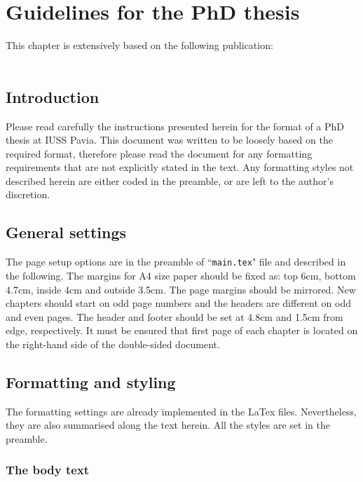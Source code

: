 \chapter{Guidelines for the PhD thesis}
\label{chapter:guidelines}

This chapter is extensively based on the following publication:\\
\\


\section{Introduction}

Please read carefully the instructions presented herein for the format of a PhD thesis at IUSS Pavia. This document was written to be loosely based on the required format, therefore please read the document for any formatting requirements that are not explicitly stated in the text. Any formatting styles not described herein are either coded in the preamble, or are left to the author's discretion.

\section{General settings}

The page setup options are in the preamble of ``\texttt{main.tex}" file and described in the following. The margins for A4 size paper should be fixed as: top 6cm, bottom 4.7cm, inside 4cm and outside 3.5cm. The page margins should be mirrored. New chapters should start on odd page numbers and the headers are different on odd and even pages. The header and footer should be set at 4.8cm and 1.5cm from edge, respectively. It must be ensured that first page of each chapter is located on the right-hand side of the double-sided document.

\section{Formatting and styling}

The formatting settings are already implemented in the LaTex files. Nevertheless, they are also summarised along the text herein. All the styles are set in the preamble.

\subsection{The body text}

